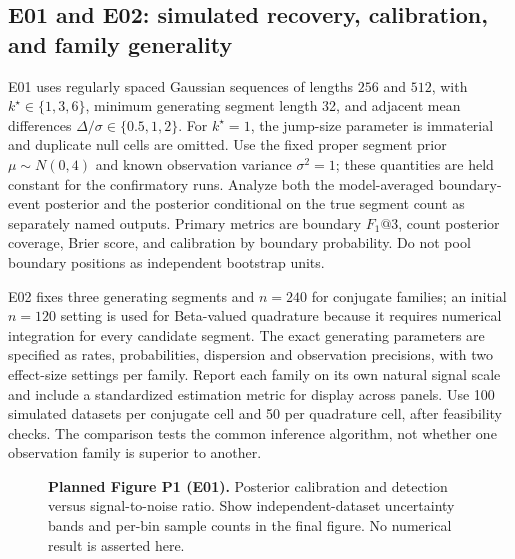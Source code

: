 \subsection{E01 and E02: simulated recovery, calibration, and family generality}
E01 uses regularly spaced Gaussian sequences of lengths $256$ and $512$, with
$k^\star\in\{1,3,6\}$, minimum generating segment length 32, and adjacent
mean differences $\Delta/\sigma\in\{0.5,1,2\}$. For $k^\star=1$, the
jump-size parameter is immaterial and duplicate null cells are omitted.
Use the fixed proper segment prior $\mu\sim N(0,4)$ and known
observation variance $\sigma^2=1$; these quantities are held constant
for the confirmatory runs. Analyze both the
model-averaged boundary-event posterior and the posterior conditional on the
true segment count as separately named outputs. Primary metrics are boundary
$F_1@3$, count posterior coverage, Brier score, and calibration by boundary
probability. Do not pool boundary positions as independent bootstrap units.

E02 fixes three generating segments and $n=240$ for conjugate families; an
initial $n=120$ setting is used for Beta-valued quadrature because it requires
numerical integration for every candidate segment. The exact generating
parameters are specified as rates, probabilities, dispersion and observation
precisions, with two effect-size settings per family. Report each family on
its own natural signal scale and include a standardized estimation metric for
display across panels. Use 100 simulated datasets per conjugate cell
and 50 per quadrature cell, after feasibility checks. The comparison tests
the common inference algorithm, not whether one observation family is superior
to another.

\begin{figure}[!htbp]
\centering
{}
\hfill
{}
\caption{\textbf{Planned Figure P1 (E01).} Posterior calibration and detection
versus signal-to-noise ratio. Show independent-dataset uncertainty bands and
per-bin sample counts in the final figure. No numerical result is asserted here.}
\label{fig:planned-calibration-paper}
\end{figure}

